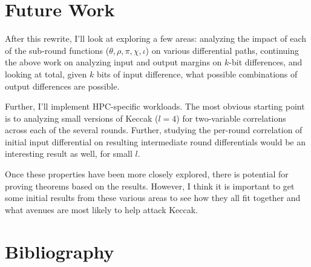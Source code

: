 \documentclass[10pt,twocolumn,twoside]{pnas-new}
\begin{document}
\section{Future Work} \label{sec:future}

    After this rewrite, I'll look at exploring a few areas: analyzing the
impact of each of the sub-round functions ($\theta, \rho, \pi, \chi, \iota$)
on various differential paths, continuing the above work on analyzing
input and output margins on $k$-bit differences, and looking at total, given
$k$ bits of input difference, what possible combinations of output differences
are possible.

    Further, I'll implement HPC-specific workloads. The most obvious starting
point is to analyzing small versions of Keccak ($l=4$) for two-variable
correlations across each of the several rounds. Further, studying the
per-round correlation of initial input differential on resulting intermediate
round differentials would be an interesting result as well, for small $l$.

    Once these properties have been more closely explored, there is potential
for proving theorems based on the results. However, I think it is important to
get some initial results from these various areas to see how they all fit
together and what avenues are most likely to help attack Keccak.


\section{Bibliography} \label{sec:bibliography}


\end{document}
